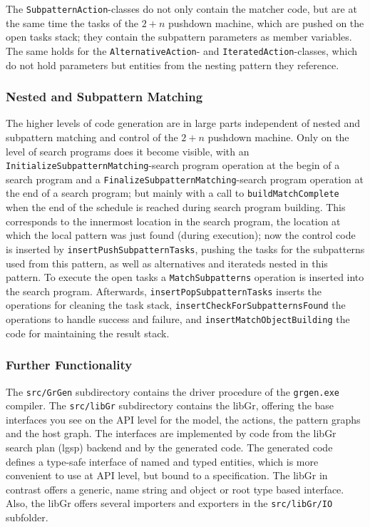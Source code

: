 The \texttt{Subpattern\-Action}-classes do not only contain the matcher code, 
but are at the same time the tasks of the $2+n$ pushdown machine, which are pushed on the open tasks stack;
they contain the subpattern parameters as member variables.
The same holds for the \texttt{Alternative\-Action}- and \texttt{Iterated\-Action}-classes,
which do not hold parameters but entities from the nesting pattern they reference. 


\subsubsection*{Nested and Subpattern Matching}

The higher levels of code generation are in large parts independent of nested and subpattern matching and control of the $2+n$ pushdown machine.
Only on the level of search programs does it become visible,  
with an \texttt{Initialize\-Subpattern\-Matching}-search program operation at the begin of a search program
and a \texttt{Finalize\-Subpattern\-Matching}-search program operation at the end of a search program;
but mainly with a call to \texttt{build\-Match\-Complete} when the end of the schedule is reached during search program building.
This corresponds to the innermost location in the search program,
the location at which the local pattern was just found (during execution);
now the control code is inserted by \texttt{insert\-Push\-Subpattern\-Tasks},
pushing the tasks for the subpatterns used from this pattern, as well as alternatives and iterateds nested in this pattern.
To execute the open tasks a \texttt{Match\-Subpatterns} operation is inserted into the search program. 
Afterwards, \texttt{insert\-Pop\-Subpattern\-Tasks} inserts the operations for cleaning the task stack,
\texttt{insert\-Check\-For\-Subpatterns\-Found} the operations to handle success and failure, 
and \texttt{insert\-Match\-Object\-Building} the code for maintaining the result stack.


\subsubsection*{Further Functionality}

The \texttt{src/GrGen} subdirectory contains the driver procedure of the \texttt{grgen.exe} compiler.
The \texttt{src/libGr} subdirectory contains the libGr, offering the base interfaces you see on the API level for the model, the actions, the pattern graphs and the host graph.
The interfaces are implemented by code from the libGr search plan (lgsp) backend and by the generated code.
The generated code defines a type-safe interface of named and typed entities, which is more convenient to use at API level, but bound to a specification.
The libGr in contrast offers a generic, name string and object or root type based interface.
Also, the libGr offers several importers and exporters in the \texttt{src/libGr/IO} subfolder.

